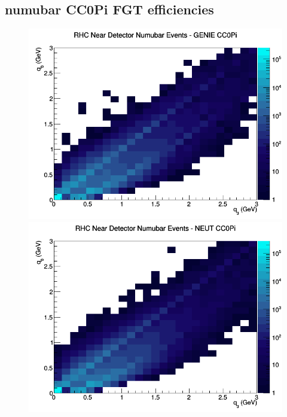 \subsection{numubar CC0Pi FGT efficiencies}
\begin{figure}[h]
\includegraphics[width=\linewidth]{eff_q0_q3/FGT/CC0Pi_RHC_ND_numubar_q3_q0_GENIE.png}
\endminipage
{}
\includegraphics[width=\linewidth]{eff_q0_q3/FGT/CC0Pi_RHC_ND_numubar_q3_q0_NEUT.png}
\endminipage
{}

\end{figure}
